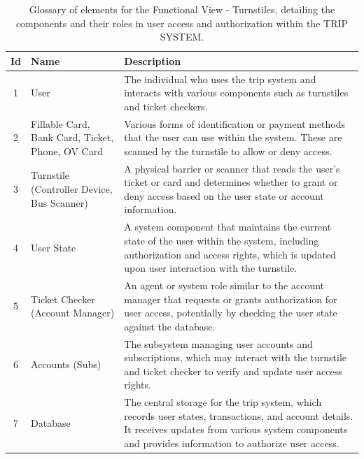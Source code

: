 \begin{table}[H] %
    \centering
    \begin{tabular}{@{}clp{9cm}@{}} %
    \toprule
    \textbf{Id} & \textbf{Name} & \textbf{Description} \\
    \midrule
    1 & User & The individual who uses the trip system and interacts with various components such as turnstiles and ticket checkers. \\
    2 & Fillable Card, Bank Card, Ticket, Phone, OV Card & Various forms of identification or payment methods that the user can use within the system. These are scanned by the turnstile to allow or deny access. \\
    3 & Turnstile (Controller Device, Bus Scanner) & A physical barrier or scanner that reads the user's ticket or card and determines whether to grant or deny access based on the user state or account information. \\
    4 & User State & A system component that maintains the current state of the user within the system, including authorization and access rights, which is updated upon user interaction with the turnstile. \\
    5 & Ticket Checker (Account Manager) & An agent or system role similar to the account manager that requests or grants authorization for user access, potentially by checking the user state against the database. \\
    6 & Accounts (Subs) & The subsystem managing user accounts and subscriptions, which may interact with the turnstile and ticket checker to verify and update user access rights. \\
    7 & Database & The central storage for the trip system, which records user states, transactions, and account details. It receives updates from various system components and provides information to authorize user access. \\
    \bottomrule
    \end{tabular}
    \caption{Glossary of elements for the Functional View - Turnstiles, detailing the components and their roles in user access and authorization within the TRIP SYSTEM.}
    \label{tab:glossary_turnstiles}
\end{table}


